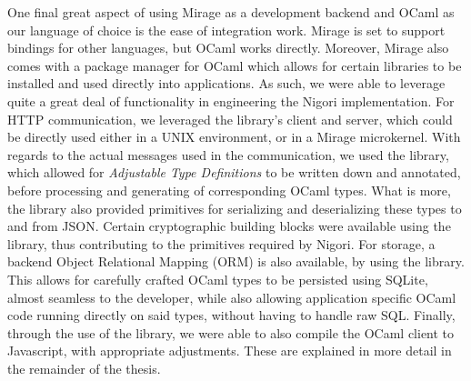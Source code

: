 One final great aspect of using Mirage as a development backend and OCaml as our language of choice is the ease of integration work.
Mirage is set to support bindings for other languages, but OCaml works directly.
Moreover, Mirage also comes with a package manager for OCaml which allows for certain libraries to be installed and used directly into applications.
As such, we were able to leverage quite a great deal of functionality in engineering the Nigori implementation.
For HTTP communication, we leveraged the  library's client and server, which could be directly used either in a UNIX environment, or in a Mirage microkernel.
With regards to the actual messages used in the communication, we used the  library, which allowed for \textit{Adjustable Type Definitions} to be written down and annotated, before processing and generating of corresponding OCaml types.
What is more, the library also provided primitives for serializing and deserializing these types to and from JSON.
Certain cryptographic building blocks were available using the  library, thus contributing to the primitives required by Nigori.
For storage, a backend Object Relational Mapping (ORM) is also available, by using the  library.
This allows for carefully crafted OCaml types to be persisted using SQLite, almost seamless to the developer, while also allowing application specific OCaml code running directly on said types, without having to handle raw SQL.
Finally, through the use of the  library, we were able to also compile the OCaml client to Javascript, with appropriate adjustments.
These are explained in more detail in the remainder of the thesis.
